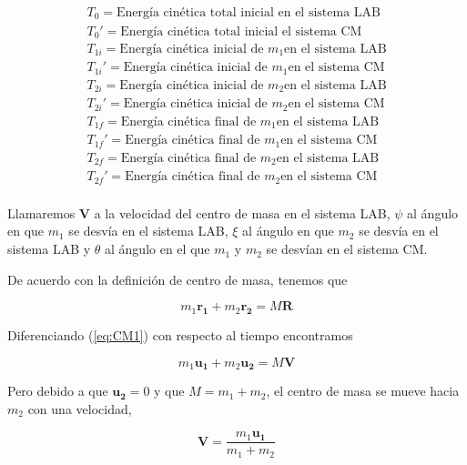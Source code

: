 \documentclass[a4paper,10pt]{article}
\begin{document}
 \begin{gather*}
  T_0 = \textrm{Energía cinética total inicial en el sistema LAB} \\
  T_0' = \textrm{Energía cinética total inicial el sistema CM} \\
%  
%  
   T_{1i} = \textrm{Energía cinética inicial de } m_1 \textrm{en el sistema LAB} \\
   T_{1i}' = \textrm{Energía cinética inicial de } m_1 \textrm{en el sistema CM} \\
%   
   T_{2i} = \textrm{Energía cinética inicial de } m_2 \textrm{en el sistema LAB} \\
   T_{2i}' = \textrm{Energía cinética inicial de } m_2 \textrm{en el sistema CM} \\
%  
  T_{1f} = \textrm{Energía cinética final de } m_1 \textrm{en el sistema LAB} \\
  T_{1f}' = \textrm{Energía cinética final de } m_1 \textrm{en el sistema CM} \\
%  
  T_{2f} = \textrm{Energía cinética final de } m_2 \textrm{en el sistema LAB} \\
  T_{2f}' = \textrm{Energía cinética final de } m_2 \textrm{en el sistema CM} \\
%
\label{eq:energiasCineticas}
  \end{gather*}

Llamaremos $\textbf{V}$ a la velocidad del centro de masa en el sistema LAB, $\psi$ al 
ángulo en que $m_1$ se desvía en el sistema LAB, $\xi$ al ángulo en que $m_2$ se desvía
en el sistema LAB y $\theta$ al ángulo en el que $m_1$ y $m_2$ se desvían en el sistema CM.

De acuerdo con la definición de centro de masa, tenemos que

\begin{equation}
 m_1 \mathbf{r_1} + m_2 \mathbf{r_2} = M\mathbf{R}
 \label{eq:CM1}
\end{equation}

Diferenciando (\ref{eq:CM1}) con respecto al tiempo encontramos

\begin{equation}
 m_1 \mathbf{u_1} + m_2 \mathbf{u_2} = M\mathbf{V}
 \label{eq:CMVel1}
\end{equation}

Pero debido a que $\mathbf{u_2}=0$ y que $M=m_1+m_2$, el centro de masa se mueve
hacia $m_2$ con una velocidad,

\begin{equation}
\mathbf{V} = \frac{m_1 \mathbf{u_1}}{m_1+m_2}
 \label{eq:CMVel2}
\end{equation}
\end{document}
